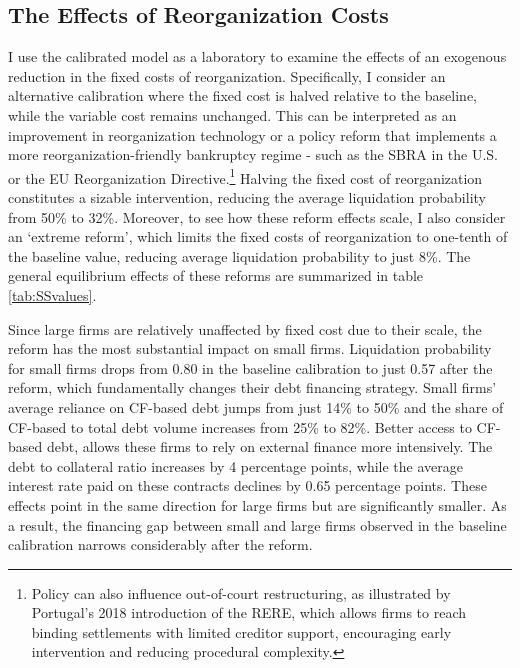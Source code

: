\documentclass[12pt]{article}
\begin{document}
\subsection{The Effects of Reorganization Costs}
I use the calibrated model as a laboratory to examine the effects of an exogenous reduction in the fixed costs of reorganization. Specifically, I consider an alternative calibration where the fixed cost is halved relative to the baseline, while the variable cost remains unchanged. This can be interpreted as an improvement in reorganization technology or a policy reform that implements a more reorganization-friendly bankruptcy regime - such as the SBRA in the U.S. or the EU Reorganization Directive.\footnote{Policy can also influence out-of-court restructuring, as illustrated by Portugal’s 2018 introduction of the RERE, which allows firms to reach binding settlements with limited creditor support, encouraging early intervention and reducing procedural complexity.} Halving the fixed cost of reorganization constitutes a sizable intervention, reducing the average liquidation probability from 50\% to 32\%. Moreover, to see how these reform effects scale, I also consider an `extreme reform', which limits the fixed costs of reorganization to one-tenth of the baseline value, reducing average liquidation probability to just 8\%. The general equilibrium effects of these reforms are summarized in table \ref{tab:SSvalues}. 
 
Since large firms are relatively unaffected by fixed cost due to their scale, the reform has the most substantial impact on small firms. Liquidation probability for small firms drops from 0.80 in the baseline calibration to just 0.57 after the reform, which fundamentally changes their debt financing strategy. Small firms' average reliance on CF-based debt jumps from just 14\% to 50\% and the share of CF-based to total debt volume increases from 25\% to 82\%. Better access to CF-based debt, allows these firms to rely on external finance more intensively. The debt to collateral ratio increases by 4 percentage points, while the average interest rate paid on these contracts declines by 0.65 percentage points. These effects point in the same direction for large firms but are significantly smaller. As a result, the financing gap between small and large firms observed in the baseline calibration narrows considerably after the reform. 
\end{document}
